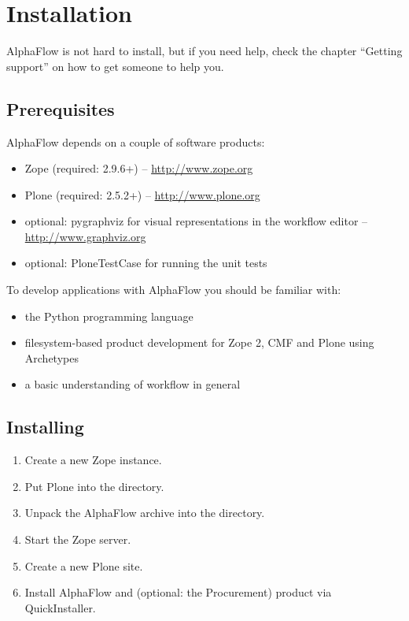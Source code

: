 \chapter{Installation}

AlphaFlow is not hard to install, but if you need help, check the chapter
``Getting support'' on how to get someone to help you.

\section{Prerequisites}

AlphaFlow depends on a couple of software products:

\begin{itemize}
    \item Zope (required: 2.9.6+) -- \url{http://www.zope.org}
    \item Plone (required: 2.5.2+) -- \url{http://www.plone.org}
    \item optional: pygraphviz for visual representations in the workflow
        editor -- \url{http://www.graphviz.org}
    \item optional: PloneTestCase for running the unit tests
\end{itemize}

To develop applications with AlphaFlow you should be familiar with:

\begin{itemize}
    \item the Python programming language
    \item filesystem-based product development for Zope 2, CMF and Plone using Archetypes
    \item a basic understanding of workflow in general
\end{itemize}

\section{Installing}

\begin{enumerate}
  \item Create a new Zope instance.
  \item Put Plone into the  directory.
  \item Unpack the AlphaFlow archive into the 
    directory.
  \item Start the Zope server.
  \item Create a new Plone site.
  \item Install AlphaFlow and (optional: the Procurement) product via QuickInstaller.
\end{enumerate}

